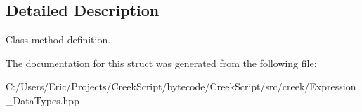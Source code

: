 \subsection{Detailed Description}
Class method definition. 

The documentation for this struct was generated from the following file\+:\begin{DoxyCompactItemize}
\item 
C\+:/\+Users/\+Eric/\+Projects/\+Creek\+Script/bytecode/\+Creek\+Script/src/creek/Expression\+\_\+\+Data\+Types.\+hpp\end{DoxyCompactItemize}
